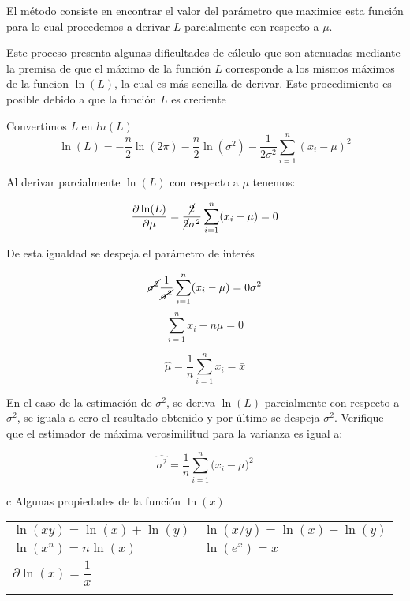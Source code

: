 \documentclass[base=hide,11pt]{elegantbook}
\begin{document}
{El método consiste en encontrar el valor del parámetro que maximice esta función para lo cual procedemos a derivar $L$ parcialmente con respecto a $\mu$.
			
Este proceso presenta algunas dificultades de cálculo que son atenuadas mediante la premisa de que el máximo de la función $L$ corresponde a los mismos máximos de la funcion $\ln(L)$, la cual es más sencilla de derivar. Este procedimiento es posible debido a que la función $L$ es creciente
			
Convertimos $L$ en $ln(L)$
$$\ln(L)= -\displaystyle\frac{n}{2} \ln(2\pi) - \displaystyle\frac{n}{2} \ln(\sigma^{2}) -\displaystyle\frac{1}{2\sigma^{2}}\displaystyle\sum_{i=1}^{n}(x_{i}-\mu)^{2}$$

Al derivar parcialmente $\ln(L)$ con respecto a $\mu$ tenemos:
			
$$\displaystyle\frac{\partial \ln(L)}{\partial \mu}= \displaystyle\frac{\cancel{2}}{\cancel{2}\sigma^{2}}  \displaystyle\sum_{i=1}^{n} (x_{i}-\mu) =0$$
			
De esta igualdad se despeja el parámetro de interés

$$\cancel{\sigma^{2}}\frac{1}{\cancel{\sigma^{2}}}\sum_{i=1}^{n} (x_{i}-\mu) =0 \sigma^{2} $$
$$\sum_{i=1}^{n} x_{i} - n \mu =0$$
			
$$\widehat{\mu}=\frac{1}{n}\sum_{i=1}^{n} x_{i} = \bar{x}$$
			
En el caso de la estimación de $\sigma^{2}$, se deriva $\ln(L)$ parcialmente con respecto a $\sigma^{2}$, se iguala a cero el resultado obtenido y por último se despeja $\sigma^{2}$. Verifique que el estimador de máxima verosimilitud para la varianza es igual a:
			
			$$\widehat{\sigma^{2}}=\frac{1}{n}\sum_{i=1}^{n} \big(x_{i}-\mu \big)^{2} $$

\begin{center}
	\begin{tabular}{c}
Algunas propiedades de la función $\ln(x)$ \\
\hline
\begin{tabular}{ll}
$\ln(xy) = \ln(x) + \ln(y)$ &
$\ln(x/y) = \ln(x) - \ln(y)$ \\
$\ln(x^{n})=n \ln(x)$ &
$\ln(e^{x}) = x$ \\
$\partial \ln(x)=\dfrac{1}{x}$&\\
&\\
\end{tabular} \\
\hline
\end{tabular}
\end{center}

}
\end{document}

